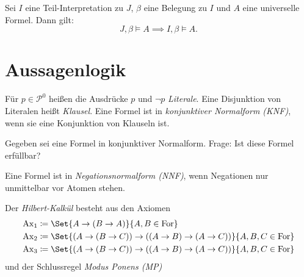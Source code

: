 \documentclass{cheat-sheet}
\newcommand{\For}{\mathrm{For}} %
\newcommand{\Ax}{\mathrm{Ax}} %
\begin{document}
\begin{samepage}
  
\begin{prop}
  Sei $I$ eine Teil-Interpretation zu $J$, $\beta$ eine Belegung zu $I$ und $A$ eine universelle Formel. Dann gilt:
  \[ J, \beta \models A \implies I, \beta \models A. \]
\end{prop}

\section{Aussagenlogik}

\end{samepage}




\begin{defn}
  Für $p \in \mathcal{P}^0$ heißen die Ausdrücke $p$ und $\neg p$ \emph{Literale}. Eine Disjunktion von Literalen heißt \emph{Klausel}. Eine Formel ist in \emph{konjunktiver Normalform (KNF)}, wenn sie eine Konjunktion von Klauseln ist.
\end{defn}


\begin{prob}
  Gegeben sei eine Formel in konjunktiver Normalform. Frage: Ist diese Formel erfüllbar?
\end{prob}

\begin{defn}
  Eine Formel ist in \emph{Negationsnormalform (NNF)}, wenn Negationen nur unmittelbar vor Atomen stehen.
\end{defn}




\begin{defn}
  Der \emph{Hilbert-Kalkül} besteht aus den Axiomen
  \begin{align*}
    \Ax_1 &\coloneqq \Set{ A \to (B \to A) }{ A, B \in \For }\\
    \Ax_2 &\coloneqq \Set{ (A \to (B \to C)) \to ((A \to B) \to (A \to C)) }{ A, B, C \in \For }\\
    \Ax_3 &\coloneqq \Set{ (A \to (B \to C)) \to ((A \to B) \to (A \to C)) }{ A, B, C \in \For }
  \end{align*}
  und der Schlussregel \emph{Modus Ponens (MP)}
  \begin{prooftree}
  \end{prooftree}
\end{defn}
\end{document}
